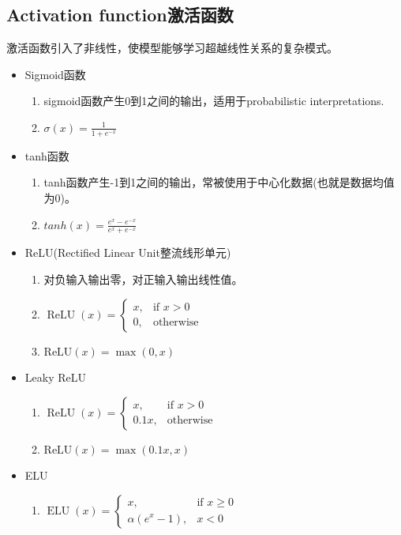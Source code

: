 \documentclass[UTF8]{ctexart}
\begin{document}
\subsection{Activation function激活函数}
激活函数引入了非线性，使模型能够学习超越线性关系的复杂模式。

\begin{itemize}
    \item Sigmoid函数
    \begin{enumerate}
        \item sigmoid函数产生0到1之间的输出，适用于probabilistic interpretations.
        \item $\sigma(x)=\frac{1}{1+e^{-x}}$
    \end{enumerate}
    \item tanh函数
    \begin{enumerate}
        \item tanh函数产生-1到1之间的输出，常被使用于中心化数据(也就是数据均值为0)。
        \item $tanh(x)=\frac{e^{x}-e^{-x}}{e^{x}+e^{-x}}$
    \end{enumerate}
    \item ReLU(Rectified Linear Unit整流线形单元)
    \begin{enumerate}
        \item 对负输入输出零，对正输入输出线性值。
        \item $\operatorname{ReLU}(x) = \begin{cases} x, & \text{if } x > 0 \\ 0, & \text{otherwise} \end{cases}$
        \item $\text{ReLU}(x) = \max(0, x)$
    \end{enumerate}
    \item Leaky ReLU
    \begin{enumerate}
        \item $\operatorname{ReLU}(x) = \begin{cases} x, & \text{if } x > 0 \\ 0.1x, & \text{otherwise} \end{cases}$
        \item $\text{ReLU}(x) = \max(0.1x, x)$
    \end{enumerate}
    \item ELU
    \begin{enumerate}
        \item $\operatorname{ELU}(x) = \begin{cases} x, & \text{if } x \geqslant  0 \\ \alpha(e^{x}-1), & x<0 \end{cases}$

\end{enumerate}
\end{itemize}
\end{document}
